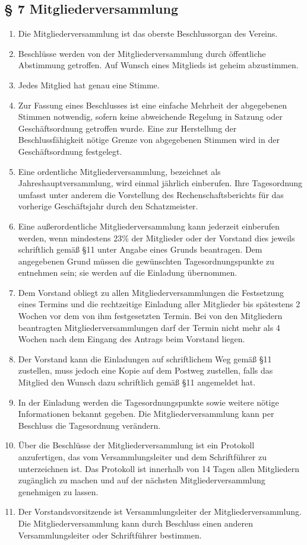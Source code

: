 ﻿\documentclass[10pt,a4paper]{scrartcl}
\begin{document}
\subsection*{§ 7 Mitgliederversammlung}
\begin{enumerate}

        \item Die Mitgliederversammlung ist das oberste Beschlussorgan des Vereins.
	\item Beschlüsse werden von der Mitgliederversammlung durch öffentliche Abstimmung getroffen.
		Auf Wunsch eines Mitglieds ist geheim abzustimmen.
	\item Jedes Mitglied hat genau eine Stimme.
	\item Zur Fassung eines Beschlusses ist eine einfache Mehrheit der abgegebenen Stimmen
             notwendig, sofern keine abweichende Regelung in Satzung oder Geschäftsordnung getroffen wurde.
			 Eine zur Herstellung der Beschlussfähigkeit nötige Grenze von abgegebenen Stimmen wird in der
			 Geschäftsordnung festgelegt.
	\item Eine ordentliche Mitgliederversammlung, bezeichnet als Jahreshauptversammlung,
		wird einmal jährlich einberufen. Ihre Tagesordnung umfasst unter anderem die
		Vorstellung des Rechenschaftsberichts für das vorherige Geschäftsjahr durch
		den Schatzmeister.
	\item Eine außerordentliche Mitgliederversammlung kann jederzeit einberufen werden, wenn
		mindestens 23\% der Mitglieder oder der Vorstand dies jeweils schriftlich gemäß §11
		unter Angabe eines Grunds beantragen. Dem angegebenen Grund müssen die gewünschten
		Tagesordnungspunkte zu entnehmen sein; sie werden auf die Einladung übernommen.
	\item Dem Vorstand obliegt zu allen Mitgliederversammlungen die Festsetzung eines Termins
		und die rechtzeitige Einladung aller Mitglieder bis spätestens 2 Wochen vor dem
		von ihm festgesetzten Termin. Bei von den Mitgliedern beantragten
                Mitgliederversammlungen darf der Termin nicht mehr als 4 Wochen nach dem Eingang
		des Antrags beim Vorstand liegen.
	\item Der Vorstand kann die Einladungen auf schriftlichem Weg gemäß §11 zustellen, muss
		jedoch eine Kopie auf dem Postweg zustellen, falls das Mitglied den Wunsch dazu
		schriftlich gemäß §11 angemeldet hat.
	\item In der Einladung werden die Tagesordnungspunkte sowie weitere nötige Informationen
		bekannt gegeben. Die Mitgliederversammlung kann per Beschluss die Tagesordnung
		ver\-ändern.
	\item Über die Beschlüsse der Mitgliederversammlung ist ein Protokoll anzufertigen,
		das vom Versammlungsleiter und dem Schriftführer zu unterzeichnen ist.
		Das Protokoll ist innerhalb von 14 Tagen allen Mitgliedern zugänglich zu
		machen und auf der nächsten Mitgliederversammlung genehmigen zu lassen.
	\item Der Vorstandsvorsitzende ist Versammlungsleiter der Mitgliederversammlung.
		Die Mitgliederversammlung kann durch Beschluss einen anderen Versammlungsleiter
		oder Schrift\-füh\-rer bestimmen.
\end{enumerate}
%
%
\end{document}
